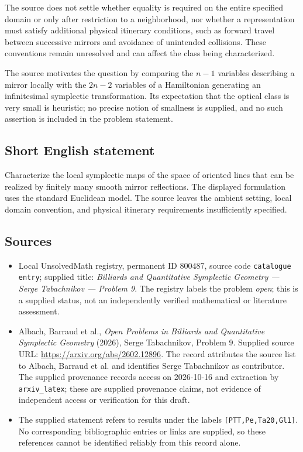 \documentclass[11pt]{article}
\begin{document}
The source does not settle whether equality is required on the entire specified domain or only after restriction to a neighborhood, nor whether a representation must satisfy additional physical itinerary conditions, such as forward travel between successive mirrors and avoidance of unintended collisions. These conventions remain unresolved and can affect the class being characterized.

The source motivates the question by comparing the \(n-1\) variables describing a mirror locally with the \(2n-2\) variables of a Hamiltonian generating an infinitesimal symplectic transformation. Its expectation that the optical class is very small is heuristic; no precise notion of smallness is supplied, and no such assertion is included in the problem statement.
\subsection{Short English statement}
Characterize the local symplectic maps of the space of oriented lines that can be realized by finitely many smooth mirror reflections. The displayed formulation uses the standard Euclidean model. The source leaves the ambient setting, local domain convention, and physical itinerary requirements insufficiently specified.
\subsection{Sources}
\begin{itemize}
\item Local UnsolvedMath registry, permanent ID \(800487\), source code \texttt{catalogue entry}; supplied title: \emph{Billiards and Quantitative Symplectic Geometry --- Serge Tabachnikov --- Problem 9}. The registry labels the problem \emph{open}; this is a supplied status, not an independently verified mathematical or literature assessment.
\item Albach, Barraud et al., \emph{Open Problems in Billiards and Quantitative Symplectic Geometry} (2026), Serge Tabachnikov, Problem 9. Supplied source URL: \url{https://arxiv.org/abs/2602.12896}. The record attributes the source list to Albach, Barraud et al. and identifies Serge Tabachnikov as contributor. The supplied provenance records access on 2026-10-16 and extraction by \texttt{arxiv\_latex}; these are supplied provenance claims, not evidence of independent access or verification for this draft.
\item The supplied statement refers to results under the labels \texttt{[PTT,Pe,Ta20,Gl1]}. No corresponding bibliographic entries or links are supplied, so these references cannot be identified reliably from this record alone.
\end{itemize}
\end{document}
